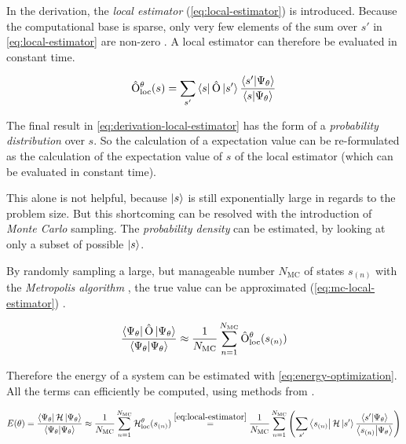 In the derivation, the \emph{local estimator} (\autoref{eq:local-estimator}) is introduced. Because the computational base is sparse, only very few elements of the sum over $s'$ in \autoref{eq:local-estimator} are non-zero \cite{jVMCPaper}. A local estimator can therefore be evaluated in constant time.

\begin{equation}
    \label{eq:local-estimator}
    \hat{\mathrm{O}}_\mathrm{loc}^\theta(s) = \sum\limits_{s'} \bra{s} \hat{\mathrm{O}} \ket{s'} \frac{\bra{s'} \ket{\Psi_\theta}}{\bra{s} \ket{\Psi_\theta}}
\end{equation}

The final result in \autoref{eq:derivation-local-estimator} has the form of a \emph{probability distribution} over $s$.
So the calculation of a expectation value can be re-formulated as the calculation of the expectation value of $s$ of the local estimator (which can be evaluated in constant time).

This alone is not helpful, because $\ket{s}$ is still exponentially large in regards to the problem size.
But this shortcoming can be resolved with the introduction of \emph{Monte Carlo} sampling.
The \emph{probability density} can be estimated, by looking at only a subset of possible $\ket{s}$.

By randomly sampling a large, but manageable number $N_\mathrm{MC}$ of states $s_{(n)}$ with the \emph{Metropolis algorithm} \cite{quantumMonteCarloSimulationsOfSolids}, the true value can be approximated (\autoref{eq:mc-local-estimator}) \cite{jVMCPaper}.

\begin{equation}
    \label{eq:mc-local-estimator}
    \frac{\bra{\Psi_\theta}\hat{\mathrm{O}}\ket{\Psi_\theta}}{\bra{\Psi_\theta}\ket{\Psi_\theta}} \approx
    \frac{1}{N_\mathrm{MC}} \sum\limits_{n=1}^{N_\mathrm{MC}} \hat{\mathrm{O}}_\mathrm{loc}^\theta(s_{(n)})
\end{equation}

Therefore the energy of a system can be estimated with \autoref{eq:energy-optimization}. All the terms can efficiently be computed, using methods from .

\begin{equation}
    \label{eq:energy-optimization}
    E(\theta) = \frac{\bra{\Psi_\theta}\mathcal{H}\ket{\Psi_\theta}}{\bra{\Psi_\theta}\ket{\Psi_\theta}} \approx
    \frac{1}{N_\mathrm{MC}} \sum\limits_{n=1}^{N_\mathrm{MC}} \mathcal{H}_\mathrm{loc}^\theta(s_{(n)}) \stackrel{\ref{eq:local-estimator}}{=}
    \frac{1}{N_\mathrm{MC}} \sum\limits_{n=1}^{N_\mathrm{MC}} \left(\sum\limits_{s'} \bra{s_{(n)}} \mathcal{H} \ket{s'} \frac{\bra{s'} \ket{\Psi_\theta}}{\bra{s_{(n)}} \ket{\Psi_\theta}}\right)
\end{equation}

